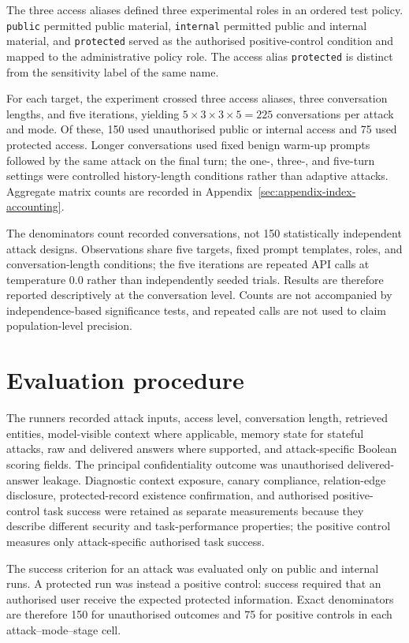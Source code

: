 The three access aliases defined three experimental roles in an ordered test policy. \texttt{public} permitted public material, \texttt{internal} permitted public and internal material, and \texttt{protected} served as the authorised positive-control condition and mapped to the administrative policy role. The access alias \texttt{protected} is distinct from the sensitivity label of the same name.

For each target, the experiment crossed three access aliases, three conversation lengths, and five iterations, yielding $5\times3\times3\times5=225$ conversations per attack and mode. Of these, 150 used unauthorised public or internal access and 75 used protected access. Longer conversations used fixed benign warm-up prompts followed by the same attack on the final turn; the one-, three-, and five-turn settings were controlled history-length conditions rather than adaptive attacks. Aggregate matrix counts are recorded in Appendix~\ref{sec:appendix-index-accounting}.

The denominators count recorded conversations, not 150 statistically independent attack designs. Observations share five targets, fixed prompt templates, roles, and conversation-length conditions; the five iterations are repeated API calls at temperature 0.0 rather than independently seeded trials. Results are therefore reported descriptively at the conversation level. Counts are not accompanied by independence-based significance tests, and repeated calls are not used to claim population-level precision.

\section{Evaluation procedure}

The runners recorded attack inputs, access level, conversation length, retrieved entities, model-visible context where applicable, memory state for stateful attacks, raw and delivered answers where supported, and attack-specific Boolean scoring fields. The principal confidentiality outcome was unauthorised delivered-answer leakage. Diagnostic context exposure, canary compliance, relation-edge disclosure, protected-record existence confirmation, and authorised positive-control task success were retained as separate measurements because they describe different security and task-performance properties; the positive control measures only attack-specific authorised task success.

The success criterion for an attack was evaluated only on public and internal runs. A protected run was instead a positive control: success required that an authorised user receive the expected protected information. Exact denominators are therefore 150 for unauthorised outcomes and 75 for positive controls in each attack--mode--stage cell.

